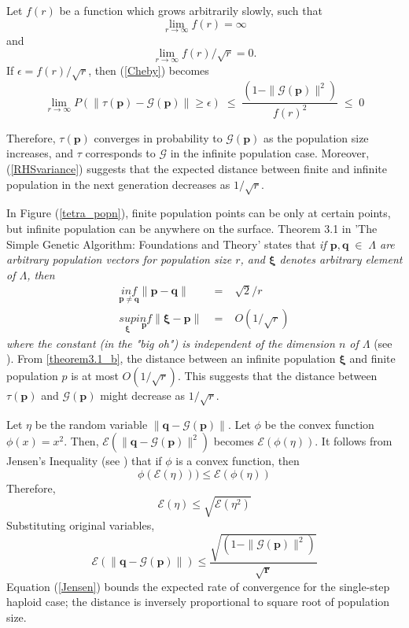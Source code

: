 Let $f(r)$ be a function which grows arbitrarily slowly, such that 
\[
\lim_{r \to \infty} f(r)  =  \infty
\]
and
\[
\lim_{r \to \infty} f(r)/\sqrt{r}  =  0.
\]
If $\epsilon  =  f(r)/\sqrt{r}$, then (\ref{Cheby}) becomes
\begin{equation*}
\lim_{r \to \infty} P(\| \tau (\bm{p}) - \mathcal{G}(\bm{p}) \| \geq \epsilon) \; \leq \; \frac{(1 - \|\mathcal{G}(\bm{p})\|^2)} {{f(r)}^2} \; \leq \; 0
\end{equation*}

Therefore, $\tau(\bm{p})$ converges in probability to $\mathcal{G}(\bm{p})$ as the population size increases, 
and $\tau$ corresponds to $\mathcal{G}$ 
in the infinite population case. Moreover, (\ref{RHSvariance}) suggests that the expected distance between finite and 
infinite population in the next generation decreases as $1/\sqrt{r}$.

In Figure (\ref{tetra_popn}), finite population points can be only at certain points, but infinite population can be anywhere on the surface. 
Theorem 3.1 in 'The Simple Genetic Algorithm: Foundations and Theory' states that \emph{if $\bm{p},\bm{q} \;\in\; \Lambda$ are 
arbitrary population vectors for population size $r$, and $\bm{\xi}$ denotes arbitrary element of $\Lambda$, then 
\begin{eqnarray}
\underset{\bm{p} \neq \bm{q}}{inf} \|\bm{p} - \bm{q}\| &\;=\;& \sqrt{2}/r    \label{theorem3.1_a} \\
\underset{\bm{\xi}}{sup} \underset{\bm{p}}{inf} \|\bm{\xi} - \bm{p}\| &\;=\;& O(1/\sqrt{r})     \label{theorem3.1b}
\end{eqnarray}
where the constant (in the "big oh") is independent of the dimension $n$ of $\Lambda$} (see \cite{Vose1999}).
From \ref{theorem3.1_b}, the distance between an infinite population $\bm{\xi}$ and finite population $p$ is at most $O(1/\sqrt{r})$. 
This suggests that the distance between $\tau (\bm{p})$ and $\mathcal{G}(\bm{p})$ might decrease as $1/\sqrt{r}$.

Let $\eta$ be the random variable $\| \bm{q} - \mathcal{G}(\bm{p}) \|$. Let $\phi$ be the convex function $\phi (x) = x^2$. 
Then, $\mathcal{E}(\| \bm{q} - \mathcal{G}(\bm{p}) \|^2)$ becomes $\mathcal{E}(\phi (\eta))$. 
It follows from Jensen's Inequality (see \cite{JensenInequality}) that 
if $\phi$ is a convex function, then
\[
\phi(\mathcal{E}(\eta))) \leq \mathcal{E}(\phi(\eta)) 
\]
Therefore,
\[
\mathcal{E}(\eta) \leq \sqrt{\mathcal{E}(\eta^2)}
\]
Substituting original variables,
\begin{equation}
\label{Jensen}
\mathcal{E}(\| \bm{q} - \mathcal{G}(\bm{p}) \|) \leq \frac{\sqrt{(1 - \|\mathcal{G}(\bm{p})\|^2)}}{\sqrt{\bm{r}}}
\end{equation}
Equation (\ref{Jensen}) bounds the expected rate of convergence for the single-step haploid case; 
the distance is inversely proportional to square root of population size.

